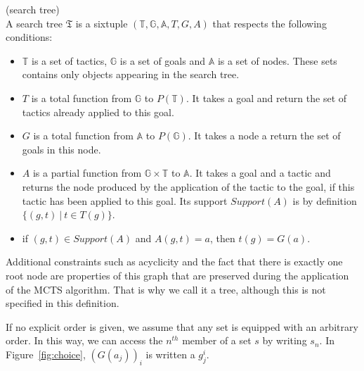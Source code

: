 \documentclass[runningheads,a4paper,draft]{svjour3}
\begin{document}
\begin{definition}(search tree)\\
A search tree $\mathfrak{T}$ is a sixtuple 
$(\mathbb{T},\mathbb{G},\mathbb{A},T,G,A)$ 
that respects the following conditions:
\begin{itemize}
\item $\mathbb{T}$ is a set of tactics, $\mathbb{G}$ is a set of goals 
 and $\mathbb{A}$ is a set of nodes. These sets contains only objects 
 appearing in the search tree.
\item $T$ is a total function from $\mathbb{G}$ to $P(\mathbb{T})$. It takes a 
goal and return the set of tactics already applied to this goal.
\item $G$ is a total function from $\mathbb{A}$ to $P(\mathbb{G})$. It takes a 
node a return the set of goals in this node.

\item $A$ is a partial function from $\mathbb{G} \times \mathbb{T}$ to 
$\mathbb{A}$. It takes a goal and a tactic and returns the node produced by the 
application of the tactic to the goal, if this tactic has been applied to this 
goal. Its support $Support(A)$ is by definition $\lbrace (g,t)\ |\ t \in T(g) 
\rbrace$.
\item if $(g,t) \in Support (A)$ and $A(g,t) = a$, then $t(g) = G(a)$.
\end{itemize}

Additional constraints such as acyclicity and the fact that there is exactly 
one root node are properties of this graph that are preserved during the 
application of the MCTS algorithm. That is why we call it a tree, although this 
is not specified in this definition.
\end{definition}

If no explicit order is given, we assume that any set is equipped with an 
arbitrary order. In this way, we can access the $n^{th}$ member of a set $s$ by 
writing $s_n$. In Figure~\ref{fig:choice}, $(G(a_j))_i$ is written a $g_j^i$.
\end{document}
